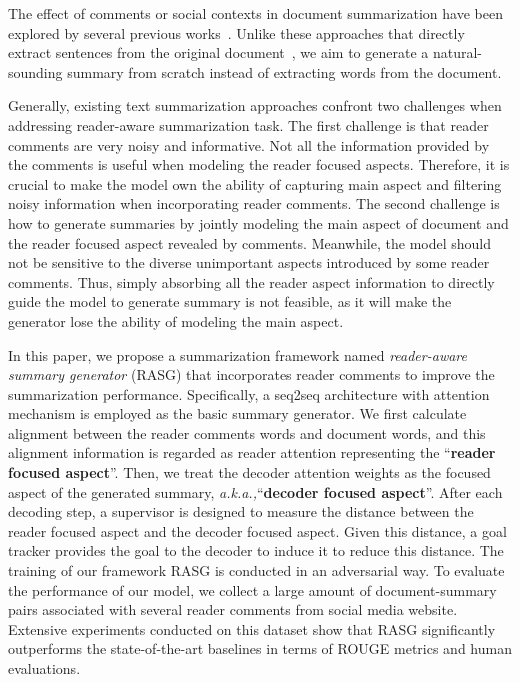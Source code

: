 \documentclass[letterpaper]{article} \usepackage{aaai19}  \usepackage{times}  \usepackage{helvet}  \usepackage{courier}
\newcommand{\aka}{\emph{a.k.a.,}\xspace}
\begin{document}
The effect of comments or social contexts in document summarization have been explored by several previous works~\cite{Hu2008CommentsorientedDS,Yang2011SocialCS,Li2015ReaderAwareMS,li2017reader}.
Unlike these approaches that directly extract sentences from the original document~\cite{Hu2008CommentsorientedDS,Yang2011SocialCS,Li2015ReaderAwareMS}, we aim to generate a natural-sounding summary from scratch instead of extracting words from the document.

Generally, existing text summarization approaches confront two challenges when addressing reader-aware summarization task.
The first challenge is that reader comments are very noisy and informative. 
Not all the information provided by the comments is useful when modeling the reader focused aspects. 
Therefore, it is crucial to make the model own the ability of capturing main aspect and filtering noisy information when incorporating reader comments. 
The second challenge is how to generate summaries by jointly modeling the main aspect of document and the reader focused aspect revealed by comments.
Meanwhile, the model should not be sensitive to the diverse unimportant aspects introduced by some reader comments. 
Thus, simply absorbing all the reader aspect information to directly guide the model to generate summary is not feasible, as it will make the generator lose the ability of modeling the main aspect.


In this paper, we propose a summarization framework named \emph{reader-aware summary generator} (RASG) that incorporates reader comments to improve the summarization performance.
Specifically, a seq2seq architecture with attention mechanism is employed as the basic summary generator.
We first calculate alignment between the reader comments words and document words, and this alignment information is regarded as reader attention representing the ``\textbf{reader focused aspect}''.
Then, we treat the decoder attention weights as the focused aspect of the generated summary, \aka ``\textbf{decoder focused aspect}''.
After each decoding step, a supervisor is designed to measure the distance between the reader focused aspect and the decoder focused aspect.
Given this distance, a goal tracker provides the goal to the decoder to induce it to reduce this distance.
The training of our framework RASG is conducted in an adversarial way.
To evaluate the performance of our model, we collect a large amount of document-summary pairs associated with several reader comments from social media website. 
Extensive experiments conducted on this dataset show that RASG significantly outperforms the state-of-the-art baselines in terms of ROUGE metrics and human evaluations.
\end{document}
